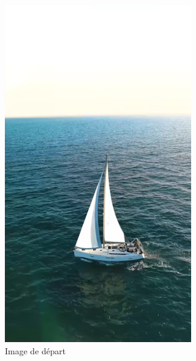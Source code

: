\documentclass[9pt]{extarticle}
\begin{document}
\begin{figure}[h]
    \centering
    \begin{subfigure}{0.3\textwidth}
        \centering
        \includegraphics[width=\textwidth]{images/sailboat.png}
        \caption{Image de départ}
    \end{subfigure}
    \hspace{0.05\textwidth} 
    \begin{subfigure}{0.3\textwidth}

\end{subfigure}
\end{figure}
\end{document}
